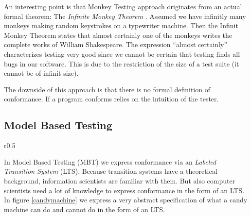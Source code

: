 \documentclass[a4paper, 12pt]{article} %
\begin{document}
An interesting point is that Monkey Testing approach originates from an
actual formal theorem: The \textit{Infinite Monkey Theorem} \cite{monkey}.
Assumed we have infinitly many monkeys making random keystrokes on a typewriter
machine. Then the Infinit Monkey Theorem states that almost
certainly one of the monkeys writes the complete works of William Shakespeare.
The expression ``almost certainly'' characterizes testing very good since we
cannot be certain that testing finds all bugs in our software. This is due to
the restriction of the size of a test suite (it cannot be of infinit size). 

The downside of this approach is that there is no formal definition of
conformance. If a program conforms relies on the intuition of the tester. 

\subsection*{Model Based Testing}

\begin{wrapfigure}{r}{0.5\textwidth} %
\caption{Candy machine specification}
\label{candymachine}
\begin{center}
\end{center}
\end{wrapfigure}
In Model Based Testing (MBT) we express conformance via an \textit{Labeled
Transition System} (LTS). Because transition systems have a theoretical
background, information scientists are familiar with them. But also computer
scientists need a lot of knowledge to express conformance in the form of an LTS. 
In figure \ref{candymachine} we express a very abstract specification of what a candy
machine can do and cannot do in the form of an LTS.
\end{document}
